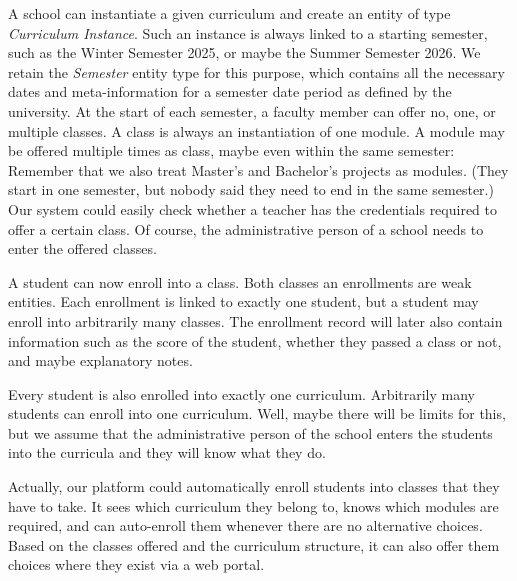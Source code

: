 A school can instantiate a given curriculum and create an entity of type \emph{Curriculum Instance}.
Such an instance is always linked to a starting semester, such as the Winter Semester 2025, or maybe the Summer Semester 2026.
We retain the \emph{Semester} entity type for this purpose, which contains all the necessary dates and meta-information for a semester date period as defined by the university.
At the start of each semester, a faculty member can offer no, one, or multiple classes.
A class is always an instantiation of one module.
A module may be offered multiple times as class, maybe even within the same semester:
Remember that we also treat Master's and Bachelor's projects as modules.
(They start in one semester, but nobody said they need to end in the same semester.)
Our system could easily check whether a teacher has the credentials required to offer a certain class.
Of course, the administrative person of a school needs to enter the offered classes.

A student can now enroll into a class.
Both classes an enrollments are weak entities.
Each enrollment is linked to exactly one student, but a student may enroll into arbitrarily many classes.
The enrollment record will later also contain information such as the score of the student, whether they passed a class or not, and maybe explanatory notes.

Every student is also enrolled into exactly one curriculum.
Arbitrarily many students can enroll into one curriculum.
Well, maybe there will be limits for this, but we assume that the administrative person of the school enters the students into the curricula and they will know what they do.

Actually, our platform could automatically enroll students into classes that they have to take.
It sees which curriculum they belong to, knows which modules are required, and can auto-enroll them whenever there are no alternative choices.
Based on the classes offered and the curriculum structure, it can also offer them choices where they exist via a web portal.


